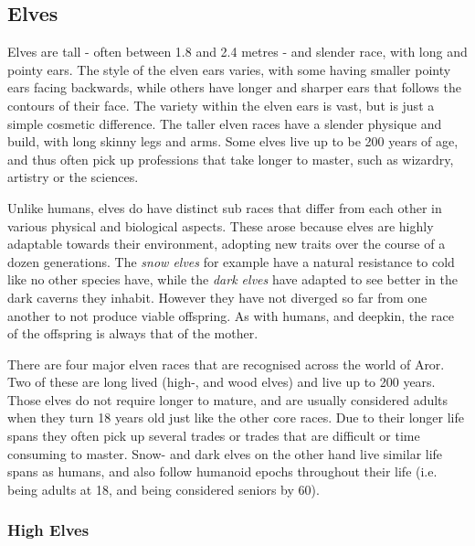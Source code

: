 \subsection{Elves}
\label{sec:Elves}

Elves are tall - often between 1.8 and 2.4 metres - and slender race, with
long and pointy ears. The style of the elven ears varies, with some having
smaller pointy ears facing backwards, while others have longer and sharper
ears that follows the contours of their face. The variety within the elven
ears is vast, but is just a simple cosmetic difference. The taller elven races
have a slender physique and build, with long skinny legs and arms. Some elves
live up to be 200 years of age, and thus often pick up professions that take
longer to master, such as wizardry, artistry or the sciences.

Unlike humans, elves do have distinct sub races that differ from each other in
various physical and biological aspects. These arose because elves are highly
adaptable towards their environment, adopting new traits over the course of a
dozen generations. The \emph{snow elves} for example have a natural resistance
to cold like no other species have, while the \emph{dark elves} have adapted
to see better in the dark caverns they inhabit. However they have not diverged
so far from one another to not produce viable offspring. As with humans, and
deepkin, the race of the offspring is always that of the mother.



There are four major elven races that are recognised across the world of Aror.
Two of these are long lived (high-, and wood elves) and live up to 200
years. Those elves do not require longer to mature, and are usually considered
adults when they turn 18 years old just like the other core races. Due to their
longer life spans they often pick up several trades or trades that are
difficult or time consuming to master. Snow- and dark elves on the other hand
live similar life spans as humans, and also follow humanoid epochs throughout
their life (i.e. being adults at 18, and being considered seniors by 60).

\subsubsection{High Elves}
\label{sec:High Elves}

